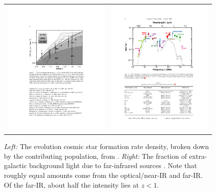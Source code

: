 \begin{figure}[h]
  \begin{tabular}{ll}
    \begin{minipage}{3.25in}
      \begin{center}
	\includegraphics[width=3.25in]{lefloch04_sf_history.pdf}
      \end{center}     
    \end{minipage} &
    \begin{minipage}{3.25in}
      \begin{center}
	\includegraphics[width=3.25in]{lagache05_firb.pdf}
      \end{center}
    \end{minipage}
  \end{tabular}
	\captionbaseline\caption {\small {\it Left:} The evolution cosmic star
	formation rate density, broken down by the contributing
	population, from \citet{lefloch04}. {\it Right:} The fraction
	of extra-galactic background light due to far-infrared sources
	\citep{lagache05}.  Note that roughly equal amounts come from
	the optical/near-IR and far-IR.  Of the far-IR, about half the
	intensity lies at $z<1$.}
	\label{fig:ScienceCase}
\end{figure}

